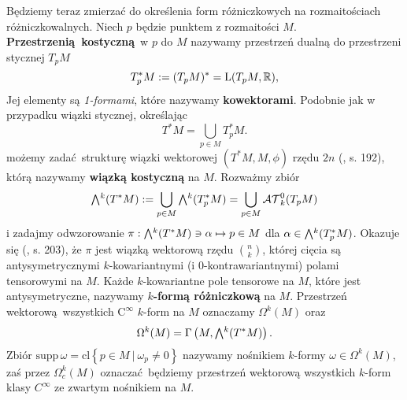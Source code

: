 Będziemy teraz zmierzać do określenia form różniczkowych na rozmaitościach różniczkowalnych. Niech \(p\) będzie punktem z rozmaitości \(M\). \textbf{Przestrzenią kostyczną} w \(p\) do \(M\) nazywamy przestrzeń dualną do przestrzeni stycznej \(T_p M\)
\begin{equation*}
    T^\ast_p M := (T_p M)^\ast = \mathrm{L}(T_p M, \mathbb{R}),
\end{equation*}
Jej elementy są \emph{1-formami}, które nazywamy \textbf{kowektorami}. Podobnie jak w przypadku wiązki stycznej, określając
\begin{equation*}
    T^\ast M = \bigcup\limits_{p\in M} T_p^\ast M.
\end{equation*}
możemy zadać strukturę wiązki wektorowej \((T^\ast M, M, \phi)\) rzędu \(2n\) (\cite{tu}, s. 192), którą nazywamy \textbf{wiązką kostyczną} na \(M\). 
Rozważmy zbiór
\begin{equation*}
    \Exterior^k(T^\ast M) := \bigcup\limits_{p\in M} \Exterior^k(T^{\ast}_p M) = \bigcup\limits_{p\in M} \mathcal{AT}^0_k(T_p M)
\end{equation*} i zadajmy odwzorowanie \(\pi: \Exterior^k (T^\ast M) \ni \alpha \mapsto p\in M\) dla 
\(\alpha \in \Exterior^k(T^{\ast}_p M)\). Okazuje się (\cite{tu}, s. 203), że \(\pi\) jest wiązką wektorową rzędu \(\binom{n}{k}\), której cięcia są antysymetrycznymi \(k\)-kowariantnymi (i \(0\)-kontrawariantnymi) polami tensorowymi na \(M\).   
Każde \(k\)-kowariantne pole tensorowe na \(M\), które jest antysymetryczne, nazywamy \textbf{\(k\)-formą różniczkową} na \(M\).
Przestrzeń wektorową wszystkich \(\mathrm{C}^\infty\) \(k\)-form na \(M\) oznaczamy \(\Omega^k(M)\) oraz
\begin{equation*}
    \Omega^k(M)=\Gamma\left(M, \Exterior^k(T^\ast M)\right).
\end{equation*}
Zbiór \(\mathrm{supp}\, \omega = \mathrm{cl}\left\{p\in M \: | \: \omega_p \neq 0\right\}\) nazywamy nośnikiem \(k\)-formy \(\omega\in\Omega^k(M)\), zaś przez \(\Omega^k_c(M)\) oznaczać będziemy przestrzeń wektorową wszystkich \(k\)-form klasy \(C^\infty\) ze zwartym nośnikiem na \(M\).

